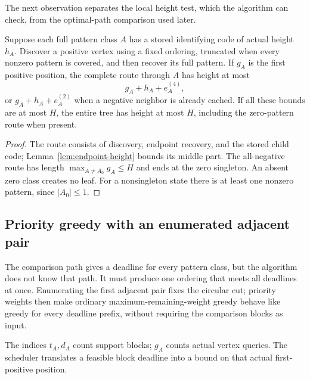 The next observation separates the local height test, which the
algorithm can check, from the optimal-path comparison used later.
\begin{lemma}\label{lem:worst-local-height}
Suppose each full pattern class $A$ has a stored identifying code
of actual height $h_A$. Discover a positive vertex using a fixed
ordering, truncated when every nonzero pattern is covered, and then
recover its full pattern. If $g_A$ is the first positive position,
the complete route through $A$ has height at most
\[
 g_A+h_A+e_A^{(4)},
\]
or $g_A+h_A+e_A^{(2)}$ when a negative neighbor is already cached.
If all these bounds are at most $H$, the entire tree has height at
most $H$, including the zero-pattern route when present.
\end{lemma}
\begin{proof}
The route consists of discovery, endpoint recovery, and the stored
child code; Lemma~\ref{lem:endpoint-height} bounds its middle part.
The all-negative route has length $\max_{A\ne A_0}g_A\le H$ and
ends at the zero singleton. An absent zero class creates no leaf.
For a nonsingleton state there is at least one nonzero pattern,
since $|A_0|\le1$.
\end{proof}

\subsection{Priority greedy with an enumerated adjacent pair}

The comparison path gives a deadline for every pattern class, but
the algorithm does not know that path. It must produce one ordering
that meets all deadlines at once. Enumerating the first adjacent
pair fixes the circular cut; priority weights then make ordinary
maximum-remaining-weight greedy behave like greedy for every
deadline prefix, without requiring the comparison blocks as input.

The indices $t_A,d_A$ count support blocks; $g_A$ counts actual
vertex queries. The scheduler translates a feasible block deadline
into a bound on that actual first-positive position.


